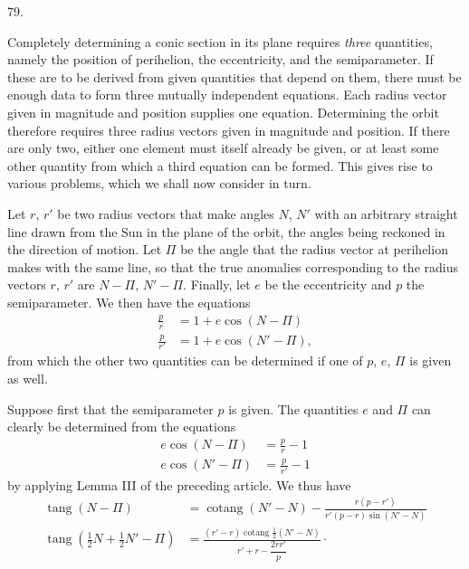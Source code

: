 \medskip
\hypertarget{native-108-article079}{}
\begin{center}79.\end{center}
Completely determining a conic section in its plane requires \emph{three} quantities, namely the position of perihelion, the eccentricity, and the semiparameter. If these are to be derived from given quantities that depend on them, there must be enough data to form three mutually independent equations. Each radius vector given in magnitude and position supplies one equation. Determining the orbit therefore requires three radius vectors given in magnitude and position. If there are only two, either one element must itself already be given, or at least some other quantity from which a third equation can be formed. This gives rise to various problems, which we shall now consider in turn.
\par
Let $r$, $r'$ be two radius vectors that make angles $N$, $N'$ with an arbitrary straight line drawn from the Sun in the plane of the orbit, the angles being reckoned in the direction of motion. Let $\Pi$ be the angle that the radius vector at perihelion makes with the same line, so that the true anomalies corresponding to the radius vectors $r$, $r'$ are $N-\Pi$, $N'-\Pi$. Finally, let $e$ be the eccentricity and $p$ the semiparameter. We then have the equations
\[
\begin{aligned}
\frac{p}{r}&=1+e\cos(N-\Pi)\\
\frac{p}{r'}&=1+e\cos(N'-\Pi),
\end{aligned}
\]
from which the other two quantities can be determined if one of $p$, $e$, $\Pi$ is given as well.
\par
Suppose first that the semiparameter $p$ is given. The quantities $e$ and $\Pi$ can clearly be determined from the equations
\[
\begin{aligned}
e\cos(N-\Pi)&=\frac{p}{r}-1\\
e\cos(N'-\Pi)&=\frac{p}{r'}-1
\end{aligned}
\]
by applying Lemma III of the preceding article. We thus have
\[
\begin{aligned}
\operatorname{tang}(N-\Pi)&=\operatorname{cotang}(N'-N)-\frac{r(p-r')}{r'(p-r)\sin(N'-N)}\\[5pt]
\operatorname{tang}(\tfrac12N+\tfrac12N'-\Pi)&=\frac{(r'-r)\operatorname{cotang}\tfrac12(N'-N)}{r'+r-\dfrac{2rr'}{p}}\mathpunct{\cdot}
\end{aligned}
\]

